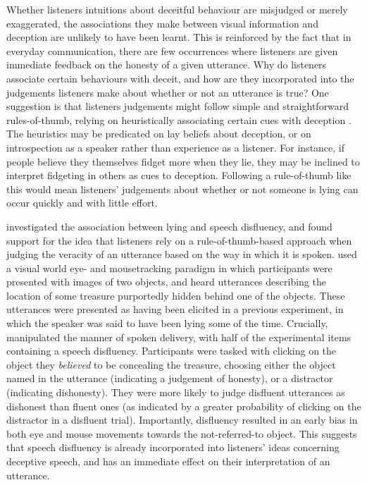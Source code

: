 \documentclass[a4paper,man,natbib]{apa6}
\begin{document}
Whether listeners intuitions about deceitful behaviour are misjudged or merely exaggerated, the associations they make between visual information and deception are unlikely to have been learnt.
This is reinforced by the fact that in everyday communication, there are few occurrences where listeners are given immediate feedback on the honesty of a given utterance.
Why do listeners associate certain behaviours with deceit, and how are they incorporated into the judgements listeners make about whether or not an utterance is true?
One suggestion is that listeners judgements might follow simple and straightforward rules-of-thumb, relying on heuristically associating certain cues with deception \citep{DePaulo1982}.
The heuristics may be predicated on lay beliefs about deception, or on introspection as a speaker rather than experience as a listener.
For instance, if people believe they themselves fidget more when they lie, they may be inclined to interpret fidgeting in others as cues to deception.
Following a rule-of-thumb like this would mean listeners' judgements about whether or not someone is lying can occur quickly and with little effort.

\citet{Loy2017} investigated the association between lying and speech disfluency, and found support for the idea that listeners rely on a rule-of-thumb-based approach when judging the veracity of an utterance based on the way in which it is spoken.
\citeauthor{Loy2017} used a visual world eye- and mousetracking paradigm in which participants were presented with images of two objects, and heard utterances describing the location of some treasure purportedly hidden behind one of the objects.
These utterances were presented as having been elicited in a previous experiment, in which the speaker was said to have been lying some of the time.
Crucially, \citet{Loy2017} manipulated the manner of spoken delivery, with half of the experimental items containing a speech disfluency.
Participants were tasked with clicking on the object they \textit{believed} to be concealing the treasure, choosing either the object named in the utterance (indicating a judgement of honesty), or a distractor (indicating dishonesty).
They were more likely to judge disfluent utterances as dishonest than fluent ones (as indicated by a greater probability of clicking on the distractor in a disfluent trial). 
Importantly, disfluency resulted in an early bias in both eye and mouse movements towards the not-referred-to object.
This suggests that speech disfluency is already incorporated into listeners' ideas concerning deceptive speech, and has an immediate effect on their interpretation of an utterance. 
\end{document}
